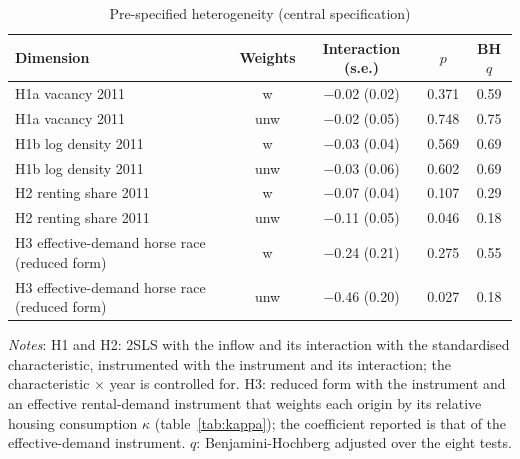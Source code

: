 \begin{table}[!htbp]\centering\small
\caption{Pre-specified heterogeneity (central specification)}\label{tab:het}
\begin{tabular}{lcccc}\toprule
Dimension & Weights & Interaction (s.e.) & $p$ & BH $q$\\\midrule
H1a vacancy 2011 & w & $-$0.02 (0.02) & 0.371 & 0.59\\
H1a vacancy 2011 & unw & $-$0.02 (0.05) & 0.748 & 0.75\\
H1b log density 2011 & w & $-$0.03 (0.04) & 0.569 & 0.69\\
H1b log density 2011 & unw & $-$0.03 (0.06) & 0.602 & 0.69\\
H2 renting share 2011 & w & $-$0.07 (0.04) & 0.107 & 0.29\\
H2 renting share 2011 & unw & $-$0.11 (0.05) & 0.046 & 0.18\\
H3 effective-demand horse race (reduced form) & w & $-$0.24 (0.21) & 0.275 & 0.55\\
H3 effective-demand horse race (reduced form) & unw & $-$0.46 (0.20) & 0.027 & 0.18\\
\bottomrule\end{tabular}
\begin{minipage}{0.95\linewidth}\footnotesize\vspace{4pt}\textit{Notes}: H1 and H2: 2SLS with the inflow and its interaction with the standardised characteristic, instrumented with the instrument and its interaction; the characteristic $\times$ year is controlled for. H3: reduced form with the instrument and an effective rental-demand instrument that weights each origin by its relative housing consumption $\kappa$ (table~\ref{tab:kappa}); the coefficient reported is that of the effective-demand instrument. $q$: Benjamini-Hochberg adjusted over the eight tests.\end{minipage}\end{table}